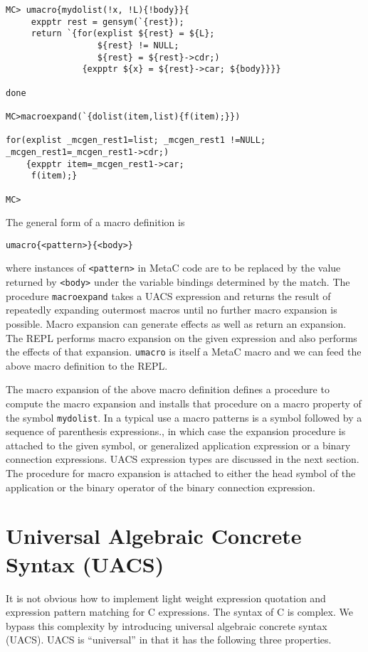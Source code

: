 \documentclass{article}
\begin{document}
\begin{verbatim}
MC> umacro{mydolist(!x, !L){!body}}{
     expptr rest = gensym(`{rest});
     return `{for(explist ${rest} = ${L};
                  ${rest} != NULL;
                  ${rest} = ${rest}->cdr;)
               {expptr ${x} = ${rest}->car; ${body}}}}

done

MC>macroexpand(`{dolist(item,list){f(item);}})

for(explist _mcgen_rest1=list; _mcgen_rest1 !=NULL; _mcgen_rest1=_mcgen_rest1->cdr;)
    {expptr item=_mcgen_rest1->car;
     f(item);}

MC>
\end{verbatim}

The general form of a macro definition is
\begin{verbatim}
umacro{<pattern>}{<body>}
\end{verbatim}
where instances of {\tt <pattern>} in MetaC code are to be replaced by the value returned by {\tt <body>} under the variable bindings determined by the match.
The procedure {\tt macroexpand} takes a UACS expression
and returns the result of repeatedly expanding outermost macros until no further macro expansion is possible.  Macro expansion can generate effects as well as return an expansion.  The REPL performs
macro expansion on the given expression and also performs the effects of that expansion.  {\tt umacro} is itself a MetaC macro and we can feed the above macro definition to the REPL.

The macro expansion of the above macro definition defines a procedure to compute the macro expansion and installs that procedure on a macro property of the symbol {\tt mydolist}.
In a typical use a macro patterns is a symbol followed by a sequence of parenthesis expressions., in which case the expansion procedure is attached to the given symbol,
or generalized application expression or a binary connection expressions.  UACS expression types are discussed in the next section.
The procedure for macro expansion is attached to either the head symbol of the application
or the binary operator of the binary connection expression.

\section{Universal Algebraic Concrete Syntax (UACS)}

It is not obvious how to implement light weight expression quotation and expression pattern matching for C expressions.  The syntax of C is complex.
We bypass this complexity by introducing universal algebraic concrete syntax (UACS). UACS is ``universal'' in that it has the following three properties.
\end{document}
